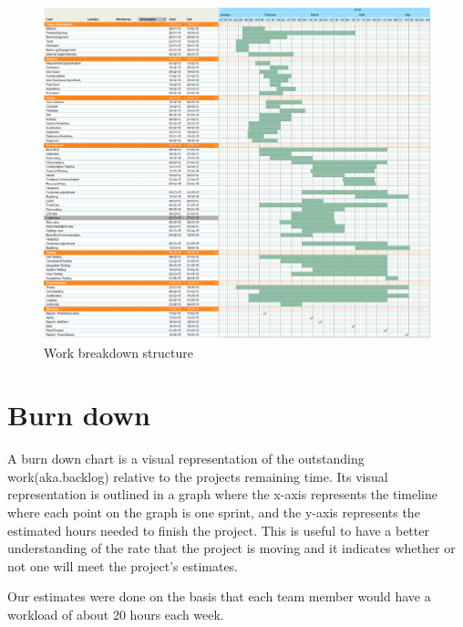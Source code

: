 
\begin{figure}[h!]
	\centering
	\includegraphics[width=\textwidth]{fig/gantt}
	\caption{Work breakdown structure}
	\label{Fig:gantt}
\end{figure}

\section{Burn down}

A burn down chart is a visual representation of the outstanding work(aka.backlog) relative to the projects remaining time. Its visual representation is outlined in a graph where the x-axis represents the timeline where each point on the graph is one sprint, and the y-axis represents the estimated hours needed to finish the project. This is useful to have a better understanding of the rate that the project is moving and it indicates whether or not one will meet the project's estimates.\newline

Our estimates were done on the basis that each team member would have a workload of about 20 hours each week. 


